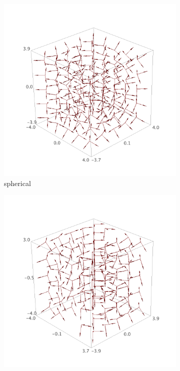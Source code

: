 \documentclass{article}
\begin{document}
\begin{figure}
    \centering
    \begin{subfigure}[b]{0.3\textwidth}
        \includegraphics[width=\textwidth]{images/spherical_bases.png}
        \caption{spherical}
    \end{subfigure}
    \begin{subfigure}[b]{0.3\textwidth}
        \includegraphics[width=\textwidth]{images/toroid_bases.png}

\end{subfigure}
\end{figure}
\end{document}
